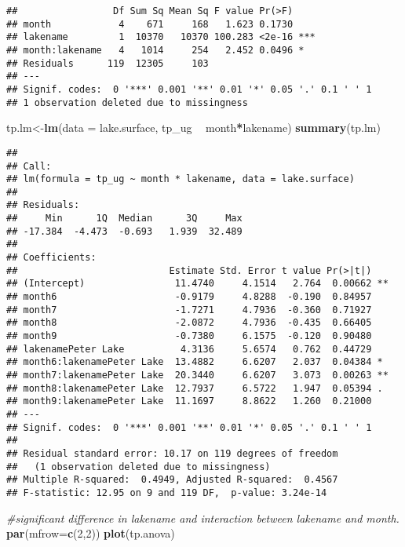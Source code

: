 \documentclass[]{article}
\newenvironment{Shaded}{\begin{snugshade}}{\end{snugshade}}
\newcommand{\CommentTok}[1]{\textcolor[rgb]{0.56,0.35,0.01}{\textit{#1}}}
\newcommand{\DataTypeTok}[1]{\textcolor[rgb]{0.13,0.29,0.53}{#1}}
\newcommand{\DecValTok}[1]{\textcolor[rgb]{0.00,0.00,0.81}{#1}}
\newcommand{\KeywordTok}[1]{\textcolor[rgb]{0.13,0.29,0.53}{\textbf{#1}}}
\newcommand{\NormalTok}[1]{#1}
\newcommand{\OperatorTok}[1]{\textcolor[rgb]{0.81,0.36,0.00}{\textbf{#1}}}
\newcommand{\StringTok}[1]{\textcolor[rgb]{0.31,0.60,0.02}{#1}}
\begin{document}
\begin{verbatim}
##                 Df Sum Sq Mean Sq F value Pr(>F)    
## month            4    671     168   1.623 0.1730    
## lakename         1  10370   10370 100.283 <2e-16 ***
## month:lakename   4   1014     254   2.452 0.0496 *  
## Residuals      119  12305     103                   
## ---
## Signif. codes:  0 '***' 0.001 '**' 0.01 '*' 0.05 '.' 0.1 ' ' 1
## 1 observation deleted due to missingness
\end{verbatim}

\begin{Shaded}
\begin{Highlighting}[]
\NormalTok{tp.lm<-}\KeywordTok{lm}\NormalTok{(}\DataTypeTok{data =}\NormalTok{ lake.surface, tp_ug }\OperatorTok{~}\StringTok{ }\NormalTok{month}\OperatorTok{*}\NormalTok{lakename)}
\KeywordTok{summary}\NormalTok{(tp.lm)}
\end{Highlighting}
\end{Shaded}

\begin{verbatim}
## 
## Call:
## lm(formula = tp_ug ~ month * lakename, data = lake.surface)
## 
## Residuals:
##     Min      1Q  Median      3Q     Max 
## -17.384  -4.473  -0.693   1.939  32.489 
## 
## Coefficients:
##                           Estimate Std. Error t value Pr(>|t|)   
## (Intercept)                11.4740     4.1514   2.764  0.00662 **
## month6                     -0.9179     4.8288  -0.190  0.84957   
## month7                     -1.7271     4.7936  -0.360  0.71927   
## month8                     -2.0872     4.7936  -0.435  0.66405   
## month9                     -0.7380     6.1575  -0.120  0.90480   
## lakenamePeter Lake          4.3136     5.6574   0.762  0.44729   
## month6:lakenamePeter Lake  13.4882     6.6207   2.037  0.04384 * 
## month7:lakenamePeter Lake  20.3440     6.6207   3.073  0.00263 **
## month8:lakenamePeter Lake  12.7937     6.5722   1.947  0.05394 . 
## month9:lakenamePeter Lake  11.1697     8.8622   1.260  0.21000   
## ---
## Signif. codes:  0 '***' 0.001 '**' 0.01 '*' 0.05 '.' 0.1 ' ' 1
## 
## Residual standard error: 10.17 on 119 degrees of freedom
##   (1 observation deleted due to missingness)
## Multiple R-squared:  0.4949, Adjusted R-squared:  0.4567 
## F-statistic: 12.95 on 9 and 119 DF,  p-value: 3.24e-14
\end{verbatim}

\begin{Shaded}
\begin{Highlighting}[]
\CommentTok{#significant difference in lakename and interaction between lakename and month.}
\KeywordTok{par}\NormalTok{(}\DataTypeTok{mfrow=}\KeywordTok{c}\NormalTok{(}\DecValTok{2}\NormalTok{,}\DecValTok{2}\NormalTok{))}
\KeywordTok{plot}\NormalTok{(tp.anova)}
\end{Highlighting}
\end{Shaded}
\end{document}

